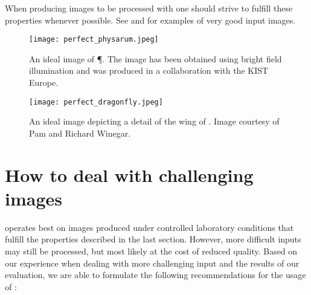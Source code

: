 	When producing images to be processed with \NEFI one should strive to fulfill these properties whenever possible. See  and  for examples of very good input images.

	\begin{figure}
		\centering
		\texttt{[image: perfect\_physarum.jpeg]}
		\caption[\NEFIs caveats: An ideal iamge of \P.]{An ideal image of \P. The image has been obtained using bright field illumination and was produced in a collaboration with the KIST Europe.}
		\label{fig:sup:good1}
	\end{figure}

	\begin{figure}
		\centering
		\texttt{[image: perfect\_dragonfly.jpeg]}
		\caption[\NEFIs caveats: An ideal iamge of \A.]{An ideal image depicting a detail of the wing of \A. Image courtesy of Pam and Richard Winegar.}
		\label{fig:sup:good2}
	\end{figure}
 
\section{How to deal with challenging images}


	\NEFI operates best on images produced under controlled laboratory conditions that fulfill the properties described in the last section. However, more difficult inputs may still be processed, but most likely at the cost of reduced quality. Based on our experience when dealing with more challenging input and the results of our evaluation, we are able to formulate the following recommendations for the usage of \NEFI:

